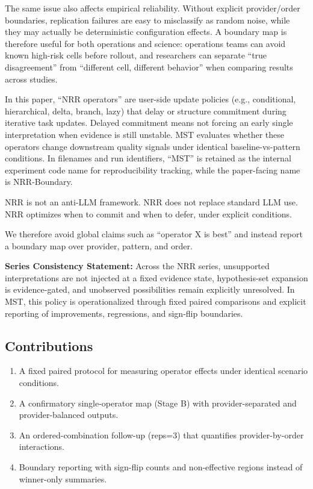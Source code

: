 \documentclass[11pt,a4paper]{article}
\begin{document}
The same issue also affects empirical reliability. Without explicit provider/order boundaries, replication failures are easy to misclassify as random noise, while they may actually be deterministic configuration effects. A boundary map is therefore useful for both operations and science: operations teams can avoid known high-risk cells before rollout, and researchers can separate ``true disagreement'' from ``different cell, different behavior'' when comparing results across studies.

In this paper, ``NRR operators'' are user-side update policies (e.g., conditional, hierarchical, delta, branch, lazy) that delay or structure commitment during iterative task updates. Delayed commitment means not forcing an early single interpretation when evidence is still unstable. MST evaluates whether these operators change downstream quality signals under identical baseline-vs-pattern conditions. In filenames and run identifiers, ``MST'' is retained as the internal experiment code name for reproducibility tracking, while the paper-facing name is NRR-Boundary.

NRR is not an anti-LLM framework.
NRR does not replace standard LLM use.
NRR optimizes when to commit and when to defer, under explicit conditions.

We therefore avoid global claims such as ``operator X is best'' and instead report a boundary map over provider, pattern, and order.

\textbf{Series Consistency Statement:}
Across the NRR series, unsupported interpretations are not injected at a fixed evidence state, hypothesis-set expansion is evidence-gated, and unobserved possibilities remain explicitly unresolved. In MST, this policy is operationalized through fixed paired comparisons and explicit reporting of improvements, regressions, and sign-flip boundaries.

\subsection{Contributions}

\begin{enumerate}
  \item A fixed paired protocol for measuring operator effects under identical scenario conditions.
  \item A confirmatory single-operator map (Stage B) with provider-separated and provider-balanced outputs.
  \item An ordered-combination follow-up (reps=3) that quantifies provider-by-order interactions.
  \item Boundary reporting with sign-flip counts and non-effective regions instead of winner-only summaries.
\end{enumerate}
\end{document}
